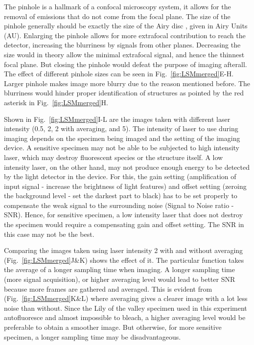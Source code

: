 The pinhole is a hallmark of a confocal microscopy system, it allows for the removal of emissions that do not come from the focal plane. 
The size of the pinhole generally should be exactly the size of the Airy disc \cite{LeicaMicro}, given in Airy Units (AU). 
Enlarging the pinhole allows for more extrafocal contribution to reach the detector, increasing the blurriness by signals from other planes. 
Decreasing the size would in theory allow the minimal extrafocal signal, and hence the thinnest focal plane. 
But closing the pinhole would defeat the purpose of imaging afterall. 
The effect of different pinhole sizes can be seen in Fig.~\ref{fig:LSMmerged}E-H. 
Larger pinhole makes image more blurry due to the reason mentioned before. 
The blurriness would hinder proper identification of structures as pointed by the red asterisk in Fig.~\ref{fig:LSMmerged}H. 

Shown in Fig.~\ref{fig:LSMmerged}I-L are the images taken with different laser intensity (0.5, 2, 2 with averaging, and 5). 
The intensity of laser to use during imaging depends on the specimen being imaged and the setting of the imaging device. 
A sensitive specimen may not be able to be subjected to high intensity laser, which may destroy fluorescent species or the structure itself. 
A low intensity laser, on the other hand, may not produce enough energy to be detected by the light detector in the device. 
For this, the gain setting (amplification of input signal - increase the brightness of light features) and offset setting (zeroing the background level - set the darkest part to black) has to be set properly to compensate the weak signal to the surrounding noise (Signal to Noise ratio - SNR). 
Hence, for sensitive specimen, a low intensity laser that does not destroy the specimen would require a compensating gain and offset setting. 
The SNR in this case may not be the best. 

Comparing the images taken using laser intensity 2 with and without averaging (Fig.~\ref{fig:LSMmerged}J\&K) shows the effect of it. 
The particular function takes the average of a longer sampling time when imaging. 
A longer sampling time (more signal acquisition), or higher averaging level would lead to better SNR because more frames are gathered and averaged. 
This is evident from (Fig.~\ref{fig:LSMmerged}K\&L) where averaging gives a clearer image with a lot less noise than without. 
Since the Lily of the valley specimen used in this experiment autofluoresce and almost impossible to bleach, a higher averaging level would be preferable to obtain a smoother image. 
But otherwise, for more sensitive specimen, a longer sampling time may be disadvantageous. 

